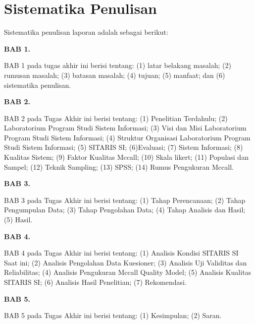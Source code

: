 \section{Sistematika Penulisan}
Sistematika penulisan laporan adalah sebagai berikut:

\textbf{BAB 1. \babSatu}

BAB 1 pada tugas akhir ini berisi tentang: (1) latar belakang masalah; (2) rumusan masalah; (3) batasan masalah; (4) tujuan; (5) manfaat; dan (6) sistematika penulisan.

\textbf{BAB 2. \babDua}

BAB 2 pada Tugas Akhir ini berisi tentang: (1) Penelitian Terdahulu; (2) Laboratorium Program Studi Sistem Informasi; (3) Visi dan Misi Laboratorium Program Studi Sistem Informasi; (4) Struktur Organisasi Laboratorium Program Studi Sistem Informasi; (5) SITARIS SI; (6)Evaluasi; (7) Sistem Informasi; (8) Kualitas Sistem; (9) Faktor Kualitas Mccall; (10) Skala likert; (11) Populasi dan Sampel; (12) Teknik Sampling; (13) SPSS; (14) Rumus Pengukuran Mccall.


\textbf{BAB 3. \babTiga}

BAB 3 pada Tugas Akhir ini berisi tentang: (1) Tahap Perencanaan; (2)
Tahap Pengumpulan Data; (3) Tahap Pengolahan Data; (4) Tahap Analisis dan
Hasil; (5) Hasil.


\textbf{BAB 4. \babEmpat}

BAB 4 pada Tugas Akhir ini berisi tentang: (1) Analisis Kondisi SITARIS SI Saat ini; (2) Analisis Pengolahan Data Kuesioner; (3) Analisis Uji Validitas dan Reliabilitas; (4) Analisis Pengukuran Mccall Quality Model; (5) Analisis Kualitas SITARIS SI; (6) Analisis Hasil Penelitian; (7) Rekomendasi.

\textbf{BAB 5. \babLima}

BAB 5 pada Tugas Akhir ini berisi tentang: (1) Kesimpulan; (2) Saran.


